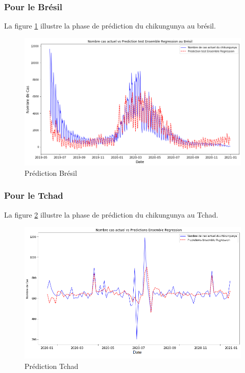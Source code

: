 \subsubsection{Pour le Brésil}
La figure \ref{fig:predictionbresil} illustre la phase de prédiction du chikungunya au brésil. 
\begin{figure}[h!]
	\centering
	\includegraphics[width=1\linewidth]{images/prediction_bresil}
	\caption{Prédiction Brésil}
	\label{fig:predictionbresil}
\end{figure}

\subsubsection{Pour le Tchad}
La figure \ref{fig:predictionchad} illustre la phase de prédiction du chikungunya au Tchad. 
\begin{figure}[h!]
	\centering
	\includegraphics[width=0.85\linewidth]{images/prediction_chad}
	\caption{Prédiction Tchad}
	\label{fig:predictionchad}
\end{figure}
